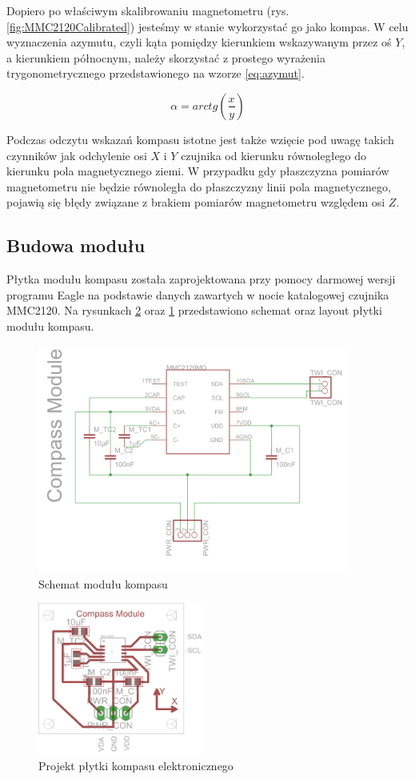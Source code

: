Dopiero po właściwym skalibrowaniu magnetometru (rys. \ref{fig:MMC2120Calibrated}) jesteśmy w stanie wykorzystać go jako kompas. W celu wyznaczenia azymutu, czyli kąta pomiędzy kierunkiem wskazywanym przez oś $Y$, a kierunkiem północnym, należy skorzystać z prostego wyrażenia trygonometrycznego przedstawionego na wzorze \ref{eq:azymut}.

\begin{equation}
  \label{eq:azymut}
  \alpha = arctg \left( \frac{x}{y} \right)
\end{equation}

Podczas odczytu wskazań kompasu istotne jest także wzięcie pod uwagę takich czynników jak odchylenie osi $X$ i $Y$ czujnika od kierunku równoległego do kierunku pola magnetycznego ziemi. W przypadku gdy płaszczyzna pomiarów magnetometru nie będzie równoległa do płaszczyzny linii pola magnetycznego, pojawią się błędy związane z brakiem pomiarów magnetometru względem osi $Z$.

\subsection{Budowa modułu}
Płytka modułu kompasu została zaprojektowana przy pomocy darmowej wersji programu Eagle na podstawie danych zawartych w nocie katalogowej czujnika MMC2120. Na rysunkach \ref{fig:MMC2120Pcb} oraz \ref{fig:MMC2120Sch} przedstawiono schemat oraz layout płytki modułu kompasu.

\begin{figure}[!ht]
 \centering
 \includegraphics[height=75mm]{../images/ch04/mmc2120mgsch.png}
 \caption{Schemat modułu kompasu}
 \label{fig:MMC2120Sch}
\end{figure}

\begin{figure}[!ht]
 \centering
 \includegraphics[height=50mm]{../images/ch04/mmc2120mgpcb.png}
 \caption{Projekt płytki kompasu elektronicznego}
 \label{fig:MMC2120Pcb}
\end{figure}

